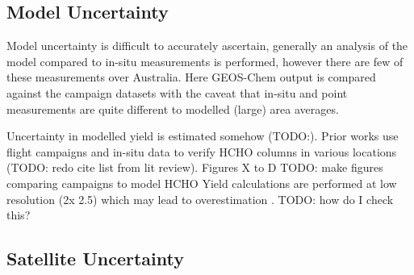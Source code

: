   \subsection{Model Uncertainty}
    \label{Model:Uncertainty:Model}
    
    Model uncertainty is difficult to accurately ascertain, generally an analysis of the model compared to in-situ measurements is performed, however there are few of these measurements over Australia.
    Here GEOS-Chem output is compared against the campaign datasets with the caveat that in-situ and point measurements are quite different to modelled (large) area averages.
    
    
    Uncertainty in modelled yield is estimated somehow (TODO:).
    Prior works use flight campaigns and in-situ data to verify HCHO columns in various locations (TODO: redo cite list from lit review).
    Figures X to D TODO: make figures comparing campaigns to model HCHO
    Yield calculations are performed at low resolution (2\degr x 2.5\degr) which may lead to overestimation \parencite{Yu2016}.
    TODO: how do I check this?
    
    
  \subsection{Satellite Uncertainty}
    \label{BioIsop:Uncertianty:Satellite}
    
